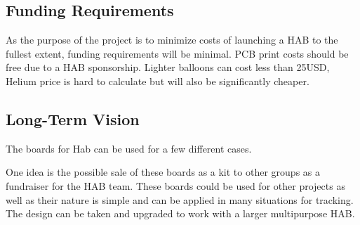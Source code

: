 \documentclass[conference]{IEEEtran} %
\begin{document}
\subsection{Funding Requirements}
As the purpose of the project is to minimize costs of launching a HAB to the
fullest extent, funding requirements will be minimal. PCB print costs should be
free due to a HAB sponsorship. Lighter balloons can cost less than 25USD, Helium
price is hard to calculate but will also be significantly cheaper.
\subsection{Long-Term Vision}
\label{sec:vision}
The boards for \textmu{}Hab can be used for a few different cases.

One idea is the possible sale of these boards as a kit to other groups as a
fundraiser for the HAB team.  These boards could be used for other projects as
well as their nature is simple and can be applied in many situations for
tracking. The design can be taken and upgraded to work with a larger
multipurpose HAB.

\onecolumn
\appendices{}
\end{document}
